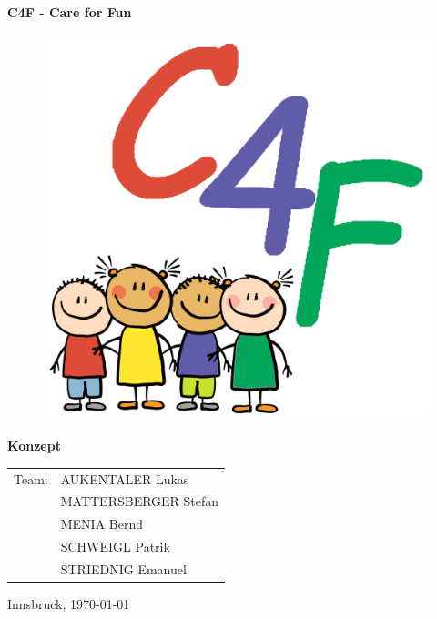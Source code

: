 \thispagestyle{empty}

\begin{center}
  \textbf{\LARGE C4F - Care for Fun}
  \begin{figure}[t]
  	\includegraphics[width = 120mm]{pictures/C4F_logo_login.png}
  \end{figure}
  
\end{center}
\vspace{1.5cm}

\begin{flushleft}
\textbf{\LARGE Konzept}

\vspace{1cm}
\begin{table}[htbp]
\Large
\begin{tabular}{cl}
   Team: & AUKENTALER Lukas \\ 
   & MATTERSBERGER Stefan \\ 
   & MENIA Bernd \\
   & SCHWEIGL Patrik \\
   & STRIEDNIG Emanuel \\
 \end{tabular}
\end{table}
\end{flushleft}

\large Innsbruck, \today

\vfill